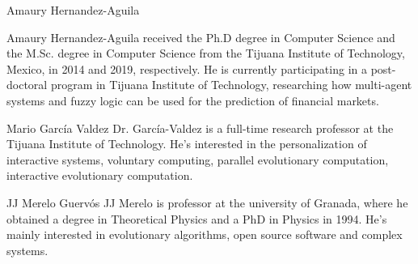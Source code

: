 \documentclass{ieeeaccess}
\begin{document}
\begin{IEEEbiography}{Amaury
  Hernandez-Aguila}

  Amaury Hernandez-Aguila received the Ph.D degree in Computer Science and the
  M.Sc. degree in Computer Science from the Tijuana Institute of Technology,
  Mexico, in 2014 and 2019, respectively. He is currently participating in a
  post-doctoral program in Tijuana Institute of Technology, researching how
  multi-agent systems and fuzzy logic can be used for the prediction of
  financial markets.

\end{IEEEbiography}

\begin{IEEEbiography}{Mario Garc\'{i}a Valdez} 
  Dr. Garc\'{i}a-Valdez is a full-time research professor at the Tijuana
  Institute of Technology. He's interested in the personalization of
  interactive systems, voluntary computing, parallel evolutionary
  computation, interactive evolutionary computation.
\end{IEEEbiography}

\begin{IEEEbiography}{JJ Merelo Guerv\'{o}s} 
  JJ Merelo is professor at the university of Granada, where he obtained a
  degree in Theoretical Physics and a PhD in Physics in 1994. He's mainly
  interested in evolutionary algorithms, open source software and complex
  systems.
  
\end{IEEEbiography}
\end{document}
